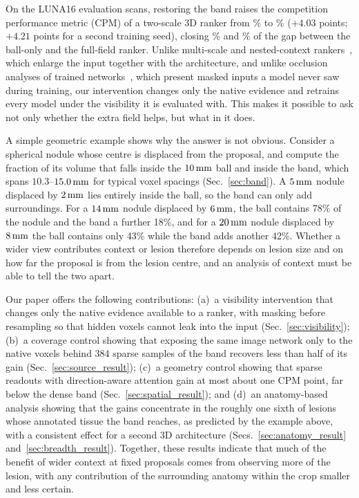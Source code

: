 On the \EvalScans{} LUNA16 evaluation scans, restoring the band raises the competition performance metric (CPM) of a two-scale 3D ranker from \BallCpm\% to \BandCpm\% ($+4.03$ points; $+4.21$ points for a second training seed), closing \PrimaryRecovery\% and \RepeatRecovery\% of the gap between the ball-only and the full-field ranker. Unlike multi-scale and nested-context rankers~\cite{dou2017multilevel,kim2018mgi}, which enlarge the input together with the architecture, and unlike occlusion analyses of trained networks~\cite{zeiler2014visualizing,fong2017meaningful}, which present masked inputs a model never saw during training, our intervention changes only the native evidence and retrains every model under the visibility it is evaluated with. This makes it possible to ask not only whether the extra field helps, but what in it does.

A simple geometric example shows why the answer is not obvious. Consider a spherical nodule whose centre is displaced from the proposal, and compute the fraction of its volume that falls inside the $10\,\mathrm{mm}$ ball and inside the band, which spans $10.3$--$15.0\,\mathrm{mm}$ for typical voxel spacings (Sec.~\ref{sec:band}). A $5\,\mathrm{mm}$ nodule displaced by $2\,\mathrm{mm}$ lies entirely inside the ball, so the band can only add surroundings. For a $14\,\mathrm{mm}$ nodule displaced by $6\,\mathrm{mm}$, the ball contains 78\% of the nodule and the band a further 18\%, and for a $20\,\mathrm{mm}$ nodule displaced by $8\,\mathrm{mm}$ the ball contains only 43\% while the band adds another 42\%. Whether a wider view contributes context or lesion therefore depends on lesion size and on how far the proposal is from the lesion centre, and an analysis of context must be able to tell the two apart.

Our paper offers the following contributions: (a)~a visibility intervention that changes only the native evidence available to a ranker, with masking before resampling so that hidden voxels cannot leak into the input (Sec.~\ref{sec:visibility}); (b)~a coverage control showing that exposing the same image network only to the native voxels behind 384 sparse samples of the band recovers less than half of its gain (Sec.~\ref{sec:source_result}); (c)~a geometry control showing that sparse readouts with direction-aware attention gain at most about one CPM point, far below the dense band (Sec.~\ref{sec:spatial_result}); and (d)~an anatomy-based analysis showing that the gains concentrate in the roughly one sixth of lesions whose annotated tissue the band reaches, as predicted by the example above, with a consistent effect for a second 3D architecture (Secs.~\ref{sec:anatomy_result} and~\ref{sec:breadth_result}). Together, these results indicate that much of the benefit of wider context at fixed proposals comes from observing more of the lesion, with any contribution of the surrounding anatomy within the crop smaller and less certain.

